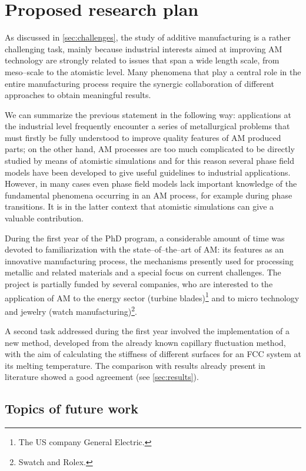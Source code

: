 \chapter{Proposed research plan}
As discussed in \cref{sec:challenges}, the study of additive manufacturing is a rather challenging task, mainly because industrial interests aimed at improving AM technology are strongly related to issues that span a wide length scale, from meso--scale to the atomistic level. Many phenomena that play a central role in the entire manufacturing process require the synergic collaboration of different approaches to obtain meaningful results.

We can summarize the previous statement in the following way: applications at the industrial level frequently encounter a series of metallurgical problems that must firstly be fully understood to improve quality features of AM produced parts; on the other hand, AM processes are too much complicated to be directly studied by means of atomistic simulations and for this reason several phase field models have been developed to give useful guidelines to industrial applications. However, in many cases even phase field models lack important knowledge of the fundamental phenomena occurring in an AM process, for example during phase transitions. It is in the latter context that atomistic simulations can give a valuable contribution. 

During the first year of the PhD program, a considerable amount of time was devoted to familiarization with the state--of--the--art of AM: its features as an innovative manufacturing process, the mechanisms presently used for processing metallic and related materials and a special focus on current challenges. The project is partially funded by several companies, who are interested to the application of AM to the energy sector (turbine blades)\footnote{The US company General Electric.} and to micro technology and jewelry (watch manufacturing)\footnote{Swatch and Rolex.}.


A second task addressed during the first year involved the implementation of a new method, developed from the already known capillary fluctuation method, with the aim of calculating the stiffness of different surfaces for an FCC system at its melting temperature. The comparison with results already present in literature showed a good agreement (see \cref{sec:results}).



\section{Topics of future work}

